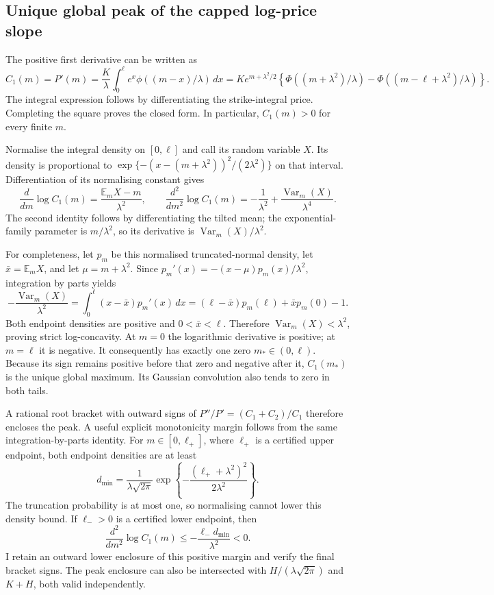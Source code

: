 \subsection{Unique global peak of the capped log-price slope}
\label{sec:capped-first-boundary-norm}

The positive first derivative can be written as
\[
 C_1(m)=P'(m)=\frac K\lambda\int_0^\ell e^x
                \phi((m-x)/\lambda)\,dx
 =Ke^{m+\lambda^2/2}
   \left\{\Phi((m+\lambda^2)/\lambda)
       -\Phi((m-\ell+\lambda^2)/\lambda)\right\}.
\]
The integral expression follows by differentiating the strike-integral
price. Completing the square proves the closed form. In particular,
$C_1(m)>0$ for every finite $m$.

Normalise the integral density on $[0,\ell]$ and call its random variable
$X$. Its density is proportional to
$\exp\{-(x-(m+\lambda^2))^2/(2\lambda^2)\}$ on that interval.
Differentiation of its normalising constant gives
\[
 \frac{d}{dm}\log C_1(m)=\frac{\mathbb E_m X-m}{\lambda^2},\qquad
 \frac{d^2}{dm^2}\log C_1(m)
 =-\frac1{\lambda^2}+\frac{\operatorname{Var}_m(X)}{\lambda^4}.
\]
The second identity follows by differentiating the tilted mean; the
exponential-family parameter is $m/\lambda^2$, so its derivative is
$\operatorname{Var}_m(X)/\lambda^2$.

For completeness, let $p_m$ be this normalised truncated-normal density,
let $\bar x=\mathbb E_m X$, and let $\mu=m+\lambda^2$. Since
$p_m'(x)=-(x-\mu)p_m(x)/\lambda^2$, integration by parts yields
\[
 -\frac{\operatorname{Var}_m(X)}{\lambda^2}
 =\int_0^\ell(x-\bar x)p_m'(x)\,dx
 =(\ell-\bar x)p_m(\ell)+\bar x p_m(0)-1.
\]
Both endpoint densities are positive and $0<\bar x<\ell$. Therefore
$\operatorname{Var}_m(X)<\lambda^2$, proving strict log-concavity.
At $m=0$ the logarithmic derivative is positive; at $m=\ell$ it is
negative. It consequently has exactly one zero $m_*\in(0,\ell)$.
Because its sign remains positive before that zero and negative after
it, $C_1(m_*)$ is the unique global maximum. Its Gaussian convolution
also tends to zero in both tails.

A rational root bracket with outward signs of
$P''/P'=(C_1+C_2)/C_1$ therefore encloses the peak. A useful explicit
monotonicity margin follows from the same integration-by-parts identity.
For $m\in[0,\ell_+]$, where $\ell_+$ is a certified upper endpoint,
both endpoint densities are at least
\[
 d_{\min}=\frac1{\lambda\sqrt{2\pi}}
       \exp\!\left\{-\frac{(\ell_++\lambda^2)^2}{2\lambda^2}\right\}.
\]
The truncation probability is at most one, so normalising cannot lower
this density bound. If $\ell_->0$ is a certified lower endpoint, then
\[
 \frac{d^2}{dm^2}\log C_1(m)
 \leq-\frac{\ell_-d_{\min}}{\lambda^2}<0.
\]
I retain an outward lower enclosure of this positive margin and verify
the final bracket signs. The peak enclosure can also be intersected with
$H/(\lambda\sqrt{2\pi})$ and $K+H$, both valid independently.

